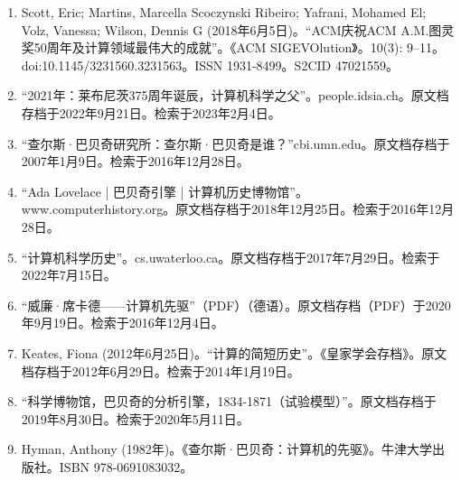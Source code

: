 \begin{enumerate}
\item Scott, Eric; Martins, Marcella Scoczynski Ribeiro; Yafrani, Mohamed El; Volz, Vanessa; Wilson, Dennis G (2018年6月5日)。“ACM庆祝ACM A.M.图灵奖50周年及计算领域最伟大的成就”。《ACM SIGEVOlution》。10(3): 9–11。doi:10.1145/3231560.3231563。ISSN 1931-8499。S2CID 47021559。  
\item “2021年：莱布尼茨375周年诞辰，计算机科学之父”。people.idsia.ch。原文档存档于2022年9月21日。检索于2023年2月4日。  
\item “查尔斯·巴贝奇研究所：查尔斯·巴贝奇是谁？”cbi.umn.edu。原文档存档于2007年1月9日。检索于2016年12月28日。  
\item “Ada Lovelace | 巴贝奇引擎 | 计算机历史博物馆”。www.computerhistory.org。原文档存档于2018年12月25日。检索于2016年12月28日。  
\item “计算机科学历史”。cs.uwaterloo.ca。原文档存档于2017年7月29日。检索于2022年7月15日。  
\item “威廉·席卡德——计算机先驱”（PDF）（德语）。原文档存档（PDF）于2020年9月19日。检索于2016年12月4日。  
\item Keates, Fiona (2012年6月25日)。“计算的简短历史”。《皇家学会存档》。原文档存档于2012年6月29日。检索于2014年1月19日。  
\item “科学博物馆，巴贝奇的分析引擎，1834-1871（试验模型）”。原文档存档于2019年8月30日。检索于2020年5月11日。  
\item Hyman, Anthony (1982年)。《查尔斯·巴贝奇：计算机的先驱》。牛津大学出版社。ISBN 978-0691083032。
\end{enumerate}